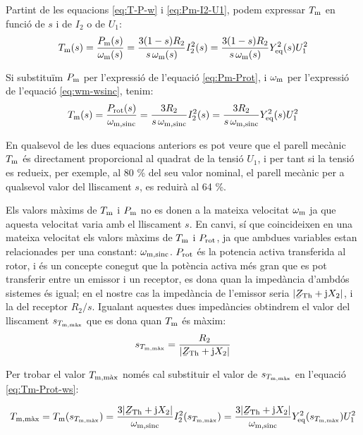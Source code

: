 Partint de les equacions \eqref{eq:T-P-w} i \eqref{eq:Pm-I2-U1}, podem expressar  $T_\mathrm{m}$ en funció de $s$ i de $I_2$ o de $U_1$:
\begin{equation}
    T_\mathrm{m}(s)  =  \frac{P_\mathrm{m}(s)}{\omega_\mathrm{m}(s)} =  \frac{3(1-s) R_2}{s\,\omega_\mathrm{m}(s)} I_2^2(s) =
     \frac{3(1-s) R_2}{s\,\omega_\mathrm{m}(s)} Y_\mathrm{eq}^2(s) U_1^2
\end{equation}

Si substituïm $P_\mathrm{m}$ per l'expressió de l'equació \eqref{eq:Pm-Prot}, i $\omega_\mathrm{m}$ per l'expressió de l'equació \eqref{eq:wm-wsinc}, tenim:
\begin{equation}\index{motors d'inducció!parell mecànic}
    T\ped{m}(s)  =  \frac{P\ped{rot}(s)}{\omega\ped{m,sinc}} =   \frac{3 R_2}{s\,\omega\ped{m,sinc}} I_2^2(s) =
     \frac{3 R_2}{s\,\omega\ped{m,sinc}} Y\ped{eq}^2(s) U_1^2 \label{eq:Tm-Prot-ws}
\end{equation}

En qualsevol de les dues equacions anteriors es pot veure que el parell mecànic $T_\mathrm{m}$ és directament proporcional al quadrat de la tensió $U_1$, i per tant si la tensió es redueix, per exemple, al 80 \% del seu valor nominal, el parell mecànic per a qualsevol valor del lliscament $s$,  es reduirà al 64 \%.

Els valors màxims de $T_\mathrm{m}$ i $P_\mathrm{m}$ no es donen a la mateixa velocitat  $\omega_\mathrm{m}$ ja que aquesta velocitat varia amb el lliscament $s$. En canvi, sí que coincideixen en una mateixa velocitat els valors  màxims de $T_\mathrm{m}$ i $P_\mathrm{rot}$, ja que ambdues variables estan relacionades per una constant: $\omega_\mathrm{m,sinc}$. $P_\mathrm{rot}$ és la potencia activa transferida al rotor, i és un concepte conegut que la potència activa més gran que es pot transferir entre un emissor i un receptor, es dona quan la impedància d'ambdós sistemes és igual; en el nostre cas la impedància de l'emissor seria $|\cmplx{Z}\ped{Th} + \ju X_2|$, i la del receptor $R_2/s$. Igualant aquestes dues impedàncies obtindrem el valor del lliscament $s_{T_\mathrm{m,\text{màx}}}$ que es dona quan $T_\mathrm{m}$ és màxim:
\begin{equation}
    s_{T\ped{m,\text{màx}}} =  \frac{R_2}{|\cmplx{Z}\ped{Th} + \ju X_2|} \label{eq:s-T-max}
\end{equation}

Per trobar el valor  $T_\mathrm{m,\text{màx}}$ només cal substituir el valor de $s_{T_\mathrm{m,\text{màx}}}$ en l'equació \eqref{eq:Tm-Prot-ws}:

\begin{equation}
    T\ped{m,\text{màx}}  =  T\ped{m}(s_{T\ped{m,\text{màx}}}) =  \frac{3 |\cmplx{Z}\ped{Th} + \ju X_2|}{\omega\ped{m,sinc}} I_2^2(s_{T\ped{m,\text{màx}}}) = \frac{3 |\cmplx{Z}\ped{Th} + \ju X_2|}{\omega\ped{m,sinc}} Y\ped{eq}^2(s_{T\ped{m,\text{màx}}}) U_1^2
\end{equation}


